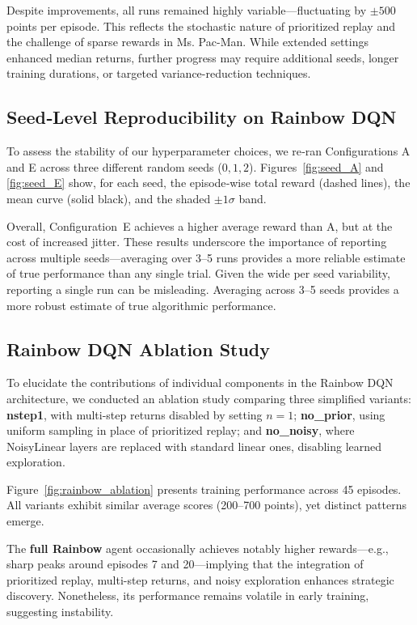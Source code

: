 \documentclass{article}
\begin{document}
Despite improvements, all runs remained highly variable—fluctuating by \(\pm500\) points per episode. This reflects the stochastic nature of prioritized replay and the challenge of sparse rewards in Ms. Pac-Man. While extended settings enhanced median returns, further progress may require additional seeds, longer training durations, or targeted variance-reduction techniques.

\subsection{Seed‐Level Reproducibility on Rainbow DQN}

To assess the stability of our hyperparameter choices, we re‑ran Configurations A and E across three different random seeds (\(0,1,2\)). Figures~\ref{fig:seed_A} and \ref{fig:seed_E} show, for each seed, the episode‑wise total reward (dashed lines), the mean curve (solid black), and the shaded \(\pm1\sigma\) band.

Overall, Configuration E achieves a higher average reward than A, but at the cost of increased jitter. These results underscore the importance of reporting across multiple seeds—averaging over 3–5 runs provides a more reliable estimate of true performance than any single trial. Given the wide per seed variability, reporting a single run can be misleading. Averaging across 3–5 seeds provides a more robust estimate of true algorithmic performance.


\subsection{Rainbow DQN Ablation Study}

To elucidate the contributions of individual components in the Rainbow DQN architecture, we conducted an ablation study comparing three simplified variants: \textbf{nstep1}, with multi-step returns disabled by setting $n=1$; \textbf{no\_prior}, using uniform sampling in place of prioritized replay; and \textbf{no\_noisy}, where NoisyLinear layers are replaced with standard linear ones, disabling learned exploration.

Figure~\ref{fig:rainbow_ablation} presents training performance across 45 episodes. All variants exhibit similar average scores (200–700 points), yet distinct patterns emerge.

The \textbf{full Rainbow} agent occasionally achieves notably higher rewards—e.g., sharp peaks around episodes 7 and 20—implying that the integration of prioritized replay, multi-step returns, and noisy exploration enhances strategic discovery. Nonetheless, its performance remains volatile in early training, suggesting instability.
\end{document}
